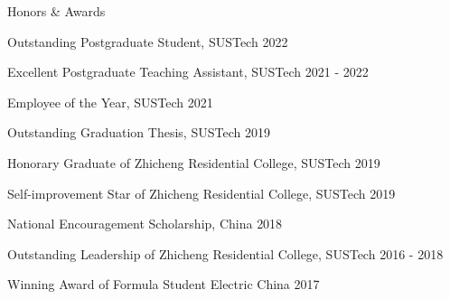\documentclass{resume} %
\begin{document}
\begin{rSection}{Honors \& Awards}
     \vspace{-8pt}
    \item {Outstanding Postgraduate Student, SUSTech}   \hfill {2022}  
     \vspace{-5pt}
    \item {Excellent Postgraduate Teaching Assistant, SUSTech}   \hfill {2021 - 2022}  
     \vspace{-5pt}
    \item {Employee of the Year, SUSTech}   \hfill {2021}  
     \vspace{-5pt}
    \item {Outstanding Graduation Thesis, SUSTech}        \hfill {2019}
     \vspace{-5pt}
    \item {Honorary Graduate of Zhicheng Residential College, SUSTech}   \hfill {2019}
     \vspace{-5pt}
    \item {Self-improvement Star of Zhicheng Residential College, SUSTech}   \hfill {2019}
     \vspace{-5pt}
    \item {National Encouragement Scholarship, China}        \hfill {2018}
     \vspace{-5pt}
    \item {Outstanding Leadership of Zhicheng Residential College, SUSTech} \hfill {2016 - 2018}
    \vspace{-5pt}  
     \item {Winning Award of Formula Student Electric China} \hfill {2017}
    \vspace{-5pt}

     


    \end{rSection}
\end{document}
